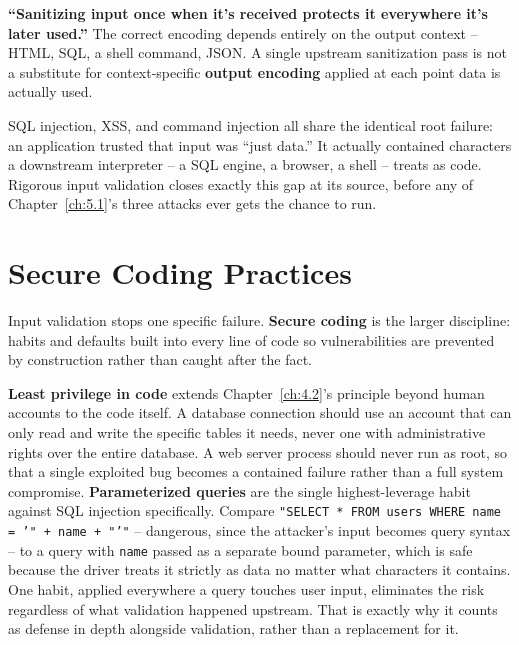 \begin{misconception}
\textbf{``Sanitizing input once when it's received protects it everywhere it's later used.''} The
correct encoding depends entirely on the output context -- HTML, SQL, a shell command, JSON. A
single upstream sanitization pass is not a substitute for context-specific \textbf{output encoding}
applied at each point data is actually used.
\end{misconception}

SQL injection, XSS, and command injection all share the identical root failure: an application
trusted that input was ``just data.'' It actually contained characters a downstream interpreter --
a SQL engine, a browser, a shell -- treats as code. Rigorous input validation closes exactly this
gap at its source, before any of Chapter~\ref{ch:5.1}'s three attacks ever gets the chance to run.

\section{Secure Coding Practices}

Input validation stops one specific failure. \textbf{Secure coding} is the larger discipline: habits
and defaults built into every line of code so vulnerabilities are prevented by construction rather
than caught after the fact.

\textbf{Least privilege in code} extends Chapter~\ref{ch:4.2}'s principle beyond human accounts to
the code itself. A database connection should use an account that can only read and write the
specific tables it needs, never one with administrative rights over the entire database. A web
server process should never run as root, so that a single exploited bug becomes a contained failure
rather than a full system compromise. \textbf{Parameterized queries} are the single highest-leverage
habit against SQL injection specifically. Compare
\texttt{"SELECT * FROM users WHERE name = '" + name + "'"} -- dangerous, since the attacker's input
becomes query syntax -- to a query with \texttt{name} passed as a separate bound parameter, which is
safe because the driver treats it strictly as data no matter what characters it contains. One habit,
applied everywhere a query touches user input, eliminates the risk regardless of what validation
happened upstream. That is exactly why it counts as defense in depth alongside validation, rather
than a replacement for it.

